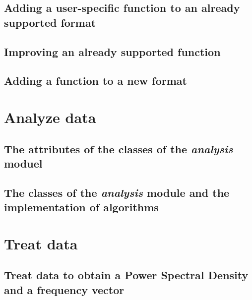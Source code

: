 \documentclass{book}
\begin{document}
        \section{Adding a user-specific function to an already supported format} \label{subsec:load_data.user_specific}
            

        \section{Improving an already supported function} \label{subsec:load_data.improvement}
            

        \section{Adding a function to a new format} \label{subsec:load_data.new_format}
            
            
    \chapter{Analyze data} \label{chap:analysis}
        
        \section{The attributes of the classes of the \textit{analysis} moduel} \label{sec:analysis.attributes}
            
        \section{The classes of the \textit{analysis} module and the implementation of algorithms} \label{sec:analysis.inheritance}
            


    \chapter{Treat data} \label{sec:treatment}
        

        \section{Treat data to obtain a Power Spectral Density and a frequency vector} \label{subsec:treatment.toPSD}
            
\end{document}
